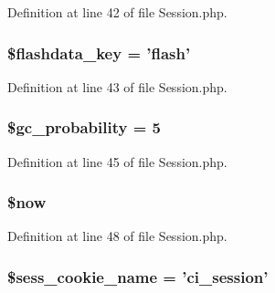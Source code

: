 Definition at line 42 of file Session.\-php.

\hypertarget{class_c_i___session_afaa74f7303193b2ca2452540c3fd45ff}{
\subsubsection[{\$flashdata\-\_\-key}]{\setlength{\rightskip}{0pt plus 5cm}\$flashdata\-\_\-key = 'flash'}}\label{class_c_i___session_afaa74f7303193b2ca2452540c3fd45ff}


Definition at line 43 of file Session.\-php.

\hypertarget{class_c_i___session_a96b09cc763572f45280786a7b33feb7e}{
\subsubsection[{\$gc\-\_\-probability}]{\setlength{\rightskip}{0pt plus 5cm}\$gc\-\_\-probability = 5}}\label{class_c_i___session_a96b09cc763572f45280786a7b33feb7e}


Definition at line 45 of file Session.\-php.

\hypertarget{class_c_i___session_af1d5ccdee975b8f4d20aaffc5b28557c}{
\subsubsection[{\$now}]{\setlength{\rightskip}{0pt plus 5cm}\$now}}\label{class_c_i___session_af1d5ccdee975b8f4d20aaffc5b28557c}


Definition at line 48 of file Session.\-php.

\hypertarget{class_c_i___session_a7e2872972d8eef9294738fd18e054fbb}{
\subsubsection[{\$sess\-\_\-cookie\-\_\-name}]{\setlength{\rightskip}{0pt plus 5cm}\$sess\-\_\-cookie\-\_\-name = 'ci\-\_\-session'}}\label{class_c_i___session_a7e2872972d8eef9294738fd18e054fbb}


